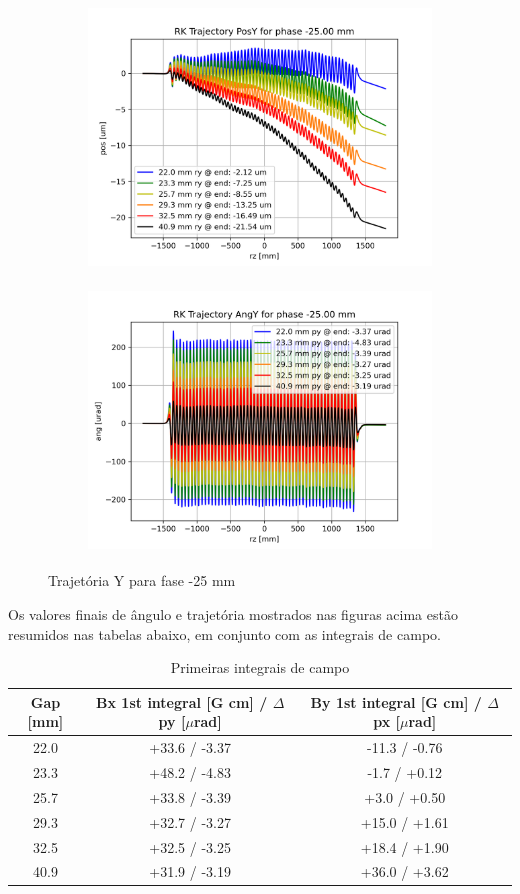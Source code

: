 \documentclass[a4paper,12pt]{article}
\begin{document}
\begin{figure}[H]
\begin{subfigure}{0.5\textwidth}
\includegraphics[width=0.9\linewidth, height=7cm]{figs/phase-25 RK Posy.png} 
\label{fig:subim1-25ty}
\end{subfigure}
\begin{subfigure}{0.5\textwidth}
\includegraphics[width=0.9\linewidth, height=7cm]{figs/phase-25 RK Angy.png}
\label{fig:subim2-25ty}
\end{subfigure}
\caption{Trajetória Y para fase -25 mm}
\label{fig:trajy-25}
\end{figure}

Os valores finais de ângulo e trajetória mostrados nas figuras acima estão resumidos nas tabelas abaixo, em conjunto com as integrais de campo.


\begin{table}[H]
\centering
\caption{Primeiras integrais de campo}
\begin{tabular}{|c|c|c|}
\hline
   Gap [mm] & Bx 1st integral [G cm] / $\Delta$ py [$\mu$rad] & By 1st integral [G cm] / $\Delta$ px [$\mu$rad] \\
\hline
        22.0 & +33.6 / -3.37 & -11.3 / -0.76 \\
        23.3 & +48.2 / -4.83 &  -1.7 / +0.12 \\
        25.7 & +33.8 / -3.39 &  +3.0 / +0.50 \\
        29.3 & +32.7 / -3.27 & +15.0 / +1.61 \\
        32.5 & +32.5 / -3.25 & +18.4 / +1.90 \\
        40.9 & +31.9 / -3.19 & +36.0 / +3.62 \\
\hline
\end{tabular}
\end{table}
\end{document}
